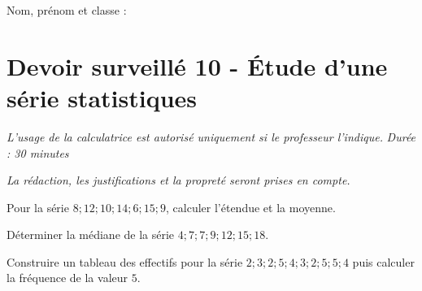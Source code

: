 \documentclass[a4paper,10pt]{report}
\begin{document}
\pagestyle{empty}
\noindent Nom, prénom et classe : \dotfill

\section*{Devoir surveillé 10 - Étude d'une série statistiques}

\noindent \textit{L'usage de la calculatrice est autorisé uniquement si le professeur l'indique.} \hfill \textit{Durée : 30 minutes}

\medskip
\noindent \textit{La rédaction, les justifications et la propreté seront prises en compte.}


\begin{ex}[Indicateurs]
Pour la série $8; 12; 10; 14; 6; 15; 9$, calculer l'étendue et la moyenne.
\medskip\noindent\grandscarreaux{\linewidth}{4cm}
\end{ex}
\begin{ex}[Médiane]
Déterminer la médiane de la série $4; 7; 7; 9; 12; 15; 18$.
\medskip\noindent\grandscarreaux{\linewidth}{3cm}
\end{ex}
\begin{ex}[Tableau]
Construire un tableau des effectifs pour la série $2;3;2;5;4;3;2;5;5;4$ puis calculer la fréquence de la valeur $5$.
\medskip\noindent\grandscarreaux{\linewidth}{5cm}
\end{ex}
\end{document}
